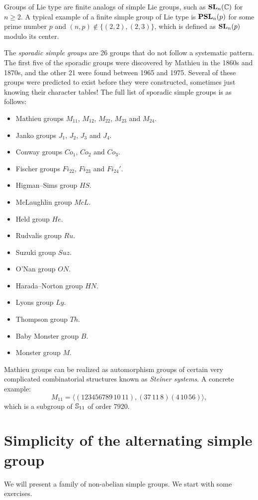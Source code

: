 Groups of Lie type are finite analogs of simple Lie groups, such as
$\mathbf{SL}_n(\mathbb{C})$ for $n\geq2$. A typical example
of a finite simple group of Lie type is
$\mathbf{PSL}_n(p)$ for some prime number $p$ and
$(n,p)\not\in\{(2,2),(2,3)\}$, which is defined
as $\mathbf{SL}_n(p)$ modulo its center.

The \emph{sporadic simple groups} are 26 groups that do not follow a systematic pattern.
The first five of the sporadic groups were discovered by Mathieu in the 1860s and 1870s, and the other 21
were found between 1965 and 1975.
Several of these groups were predicted to exist before they were constructed, sometimes
just knowing their character tables!
The full list of sporadic simple groups is as follows:
\begin{itemize}
\item Mathieu groups $M_{11}$, $M_{12}$, $M_{22}$, $M_{23}$ and $M_{24}$.
\item Janko groups $J_1$, $J_2$, $J_3$ and $J_4$.
\item Conway groups $Co_1$, $Co_2$ and $Co_3$.
\item Fischer groups $Fi_{22}$, $Fi_{23}$ and $Fi_{24}'$.
\item Higman–Sims group $HS$.
\item McLaughlin group $McL$.
\item Held group $He$.
\item Rudvalis group $Ru$.
\item Suzuki group $Suz$.
\item O'Nan group $ON$.
\item Harada–Norton group $HN$.
\item Lyons group $Ly$.
\item Thompson group $Th$.
\item Baby Monster group $B$.
\item Monster group $M$.
\end{itemize}

Mathieu groups can be realized
as automorphism groups of certain very complicated
combinatorial structures known as \emph{Steiner systems}.
A concrete example:
\[
M_{11}=\langle (123456789\,10\,11), (37\,11\,8)(4\,10\,56)\rangle,
\]
which is a subgroup of $\mathbb{S}_{11}$ of order 7920.


\section{Simplicity of the alternating simple group}

We will present a family of non-abelian simple groups. 
We start with some exercises. 

